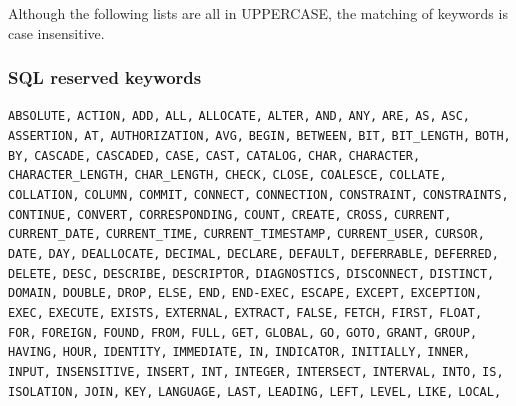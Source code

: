 \documentclass[11pt,a4paper]{ivoa}
\begin{document}
Although the following lists are all in UPPERCASE, the matching of keywords
is case insensitive.

\subsubsection{SQL reserved keywords}
\label{sec:adql.keywords}

\noindent
\texttt{ABSOLUTE,} \texttt{ACTION,} \texttt{ADD,} \texttt{ALL,} 
\texttt{ALLOCATE,} \texttt{ALTER,} \texttt{AND,} \texttt{ANY,} 
\texttt{ARE,} \texttt{AS,} \texttt{ASC,} \texttt{ASSERTION,} 
\texttt{AT,} \texttt{AUTHORIZATION,} \texttt{AVG,} \texttt{BEGIN,} 
\texttt{BETWEEN,} \texttt{BIT,} \texttt{BIT\_LENGTH,} \texttt{BOTH,} 
\texttt{BY,} \texttt{CASCADE,} \texttt{CASCADED,} \texttt{CASE,} 
\texttt{CAST,} \texttt{CATALOG,} \texttt{CHAR,} \texttt{CHARACTER,} 
\texttt{CHARACTER\_LENGTH,} \texttt{CHAR\_LENGTH,} \texttt{CHECK,} 
\texttt{CLOSE,} \texttt{COALESCE,} \texttt{COLLATE,} 
\texttt{COLLATION,} \texttt{COLUMN,} \texttt{COMMIT,} 
\texttt{CONNECT,} \texttt{CONNECTION,} \texttt{CONSTRAINT,} 
\texttt{CONSTRAINTS,} \texttt{CONTINUE,} \texttt{CONVERT,} 
\texttt{CORRESPONDING,} \texttt{COUNT,} \texttt{CREATE,} 
\texttt{CROSS,} \texttt{CURRENT,} \texttt{CURRENT\_DATE,} 
\texttt{CURRENT\_TIME,} \texttt{CURRENT\_TIMESTAMP,} 
\texttt{CURRENT\_USER,} \texttt{CURSOR,} \texttt{DATE,} \texttt{DAY,} 
\texttt{DEALLOCATE,} \texttt{DECIMAL,} \texttt{DECLARE,} 
\texttt{DEFAULT,} \texttt{DEFERRABLE,} \texttt{DEFERRED,} 
\texttt{DELETE,} \texttt{DESC,} \texttt{DESCRIBE,} 
\texttt{DESCRIPTOR,} \texttt{DIAGNOSTICS,} \texttt{DISCONNECT,} 
\texttt{DISTINCT,} \texttt{DOMAIN,} \texttt{DOUBLE,} \texttt{DROP,} 
\texttt{ELSE,} \texttt{END,} \texttt{END-EXEC,} \texttt{ESCAPE,} 
\texttt{EXCEPT,} \texttt{EXCEPTION,} \texttt{EXEC,} \texttt{EXECUTE,} 
\texttt{EXISTS,} \texttt{EXTERNAL,} \texttt{EXTRACT,} \texttt{FALSE,} 
\texttt{FETCH,} \texttt{FIRST,} \texttt{FLOAT,} \texttt{FOR,} 
\texttt{FOREIGN,} \texttt{FOUND,} \texttt{FROM,} \texttt{FULL,} 
\texttt{GET,} \texttt{GLOBAL,} \texttt{GO,} \texttt{GOTO,} 
\texttt{GRANT,} \texttt{GROUP,} \texttt{HAVING,} \texttt{HOUR,} 
\texttt{IDENTITY,} \texttt{IMMEDIATE,} \texttt{IN,} 
\texttt{INDICATOR,} \texttt{INITIALLY,} \texttt{INNER,} 
\texttt{INPUT,} \texttt{INSENSITIVE,} \texttt{INSERT,} \texttt{INT,} 
\texttt{INTEGER,} \texttt{INTERSECT,} \texttt{INTERVAL,} 
\texttt{INTO,} \texttt{IS,} \texttt{ISOLATION,} \texttt{JOIN,} 
\texttt{KEY,} \texttt{LANGUAGE,} \texttt{LAST,} \texttt{LEADING,} 
\texttt{LEFT,} \texttt{LEVEL,} \texttt{LIKE,} \texttt{LOCAL,} 
\end{document}
